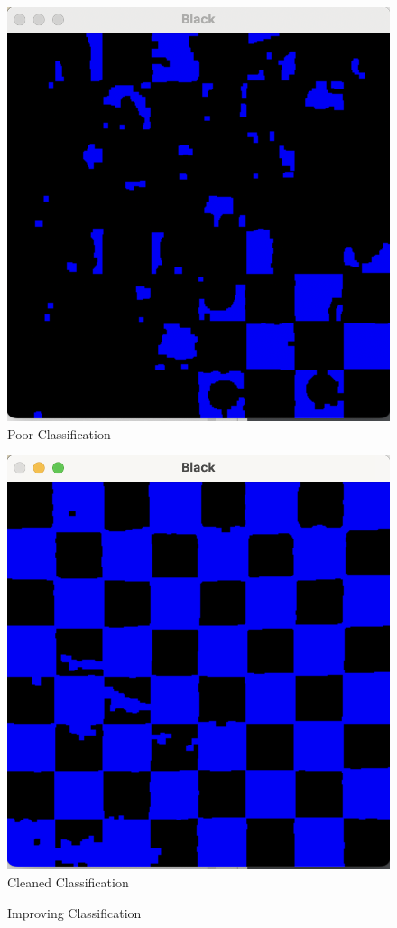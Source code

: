 \documentclass[12pt]{article}
\begin{document}
    \begin{figure}
        \begin{minipage}[c]{0.4\linewidth}
            \centering
            \includegraphics[scale=0.3]{Bad-Black-Squares.png}
            \newline
            Poor Classification
        \end{minipage}\hfill
        \begin{minipage}[c]{0.4\linewidth}
            \centering
            \includegraphics[scale=0.3]{Good-Black-Squares.png}
            Cleaned Classification
        \end{minipage}
        \caption{Improving Classification}
    \end{figure}
\end{document}
